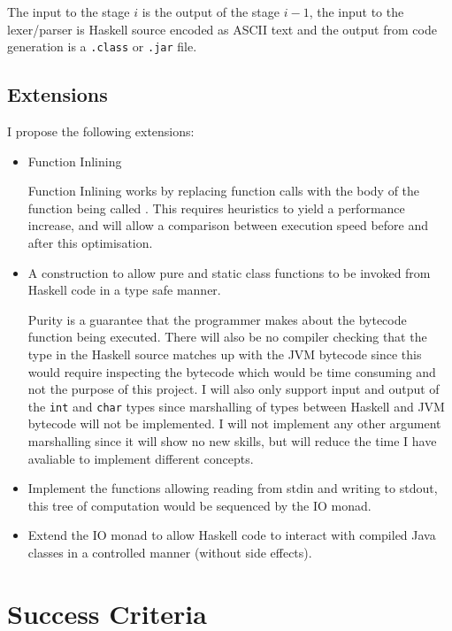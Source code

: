 \documentclass[12pt,a4paper,twoside]{article}
\begin{document}
  The input to the stage $i$ is the output of the stage $i-1$, the input to the lexer/parser is Haskell source encoded as ASCII text and the
  output from code generation is a \texttt{.class} or \texttt{.jar} file.

  \subsection*{Extensions}

  I propose the following extensions:

  \begin{itemize}
    \item Function Inlining

      Function Inlining works by replacing function calls with the body of the function being called \cite{ghc-inliner}.
      This requires heuristics to yield a performance increase, and will allow a comparison between execution speed before and after this optimisation.

    \item A construction to allow pure and static class functions to be invoked from Haskell code in a type safe manner.

      Purity is a guarantee that the programmer makes about the bytecode function being executed.
      There will also be no compiler checking that the type in the Haskell source matches up with the JVM bytecode since this would require inspecting the bytecode which
      would be time consuming and not the purpose of this project. I will also only support input and output of the \texttt{int} and \texttt{char} types since
      marshalling of types between Haskell and JVM bytecode will not be implemented. I will not implement any other argument marshalling since it will show no new
      skills, but will reduce the time I have avaliable to implement different concepts.

    \item Implement the functions allowing reading from stdin and writing to stdout, this tree of computation would be sequenced by the IO monad.

    \item Extend the IO monad to allow Haskell code to interact with compiled Java classes in a controlled manner (without side effects).

  \end{itemize}

  \section*{Success Criteria}
\end{document}
